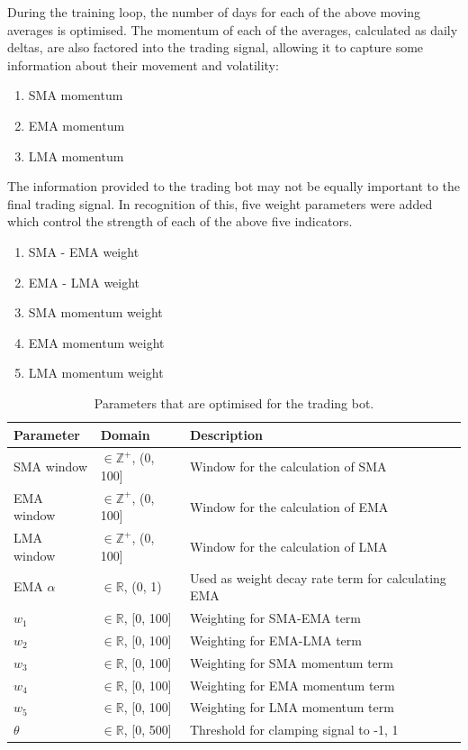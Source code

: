 \documentclass[a4paper, 12pt]{extarticle}
\begin{document}
During the training loop, the number of days for each of the above moving averages is optimised. The momentum of each of the averages, calculated as daily deltas, are also factored into the trading signal, allowing it to capture some information about their movement and volatility: 

\begin{enumerate}[start=3]
    \item SMA momentum 
    \item EMA momentum 
    \item LMA momentum 
\end{enumerate}

The information provided to the trading bot may not be equally important to the final trading signal. In recognition of this, five weight parameters were added which control the strength of each of the above five indicators. 

\begin{enumerate}[start=6]
    \item SMA - EMA weight 
    \item EMA - LMA weight 
    \item SMA momentum weight 
    \item EMA momentum weight 
    \item LMA momentum weight 
\end{enumerate}

\begin{table}[ht]
    \centering
    \begin{tabularx}{\textwidth}{X X X}
      \toprule
      \textbf{Parameter} & \textbf{Domain} & \textbf{Description} \\
      \midrule
      SMA window        & $\in \mathbb{Z}^+$, (0, 100]  & Window for the calculation of SMA \\
      EMA window        & $\in \mathbb{Z}^+$, (0, 100]  & Window for the calculation of EMA   \\
      LMA window        & $\in \mathbb{Z}^+$, (0, 100]  & Window for the calculation of LMA   \\
      EMA $\alpha$      & $\in \mathbb{R}$, (0, 1)  & Used as weight decay rate term for calculating EMA\\
      $w_1$             & $\in \mathbb{R}$, [0, 100]  & Weighting for SMA-EMA term \\
      $w_2$             & $\in \mathbb{R}$, [0, 100]  & Weighting for EMA-LMA term  \\
      $w_3$             & $\in \mathbb{R}$, [0, 100]  & Weighting for SMA momentum term \\
      $w_4$             & $\in \mathbb{R}$, [0, 100]  & Weighting for EMA momentum term\\
      $w_5$             & $\in \mathbb{R}$, [0, 100]  & Weighting for LMA momentum term \\
      $\theta$          & $\in \mathbb{R}$, [0, 500]  & Threshold for clamping signal to {-1, 1}  \\
      \bottomrule
    \end{tabularx}
    \caption{Parameters that are optimised for the trading bot.}
    \label{tab:parameters}
  \end{table}
\end{document}
